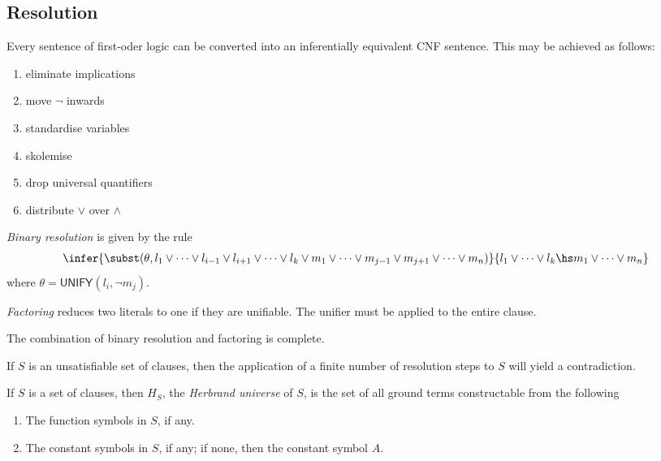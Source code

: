 \documentclass{article}
\begin{document}
\subsection{Resolution}

\begin{theorem}
    Every sentence of first-oder logic can be converted into an inferentially equivalent
    CNF sentence. This may be achieved as follows:
    \begin{enumerate}
        \item eliminate implications
        \item move $\neg$ inwards
        \item standardise variables
        \item skolemise
        \item drop universal quantifiers
        \item distribute $\vee$ over $\wedge$
    \end{enumerate}
\end{theorem}


\begin{definition}
    \emph{Binary resolution} is given by the rule
    \begin{align*}
        \infer{\subst(\theta,l_1\vee \cdots\vee l_{i-1}\vee l_{i+1}\vee\cdots\vee l_k\vee m_1\vee\cdots\vee m_{j-1}\vee m_{j+1}\vee \cdots\vee m_n)}{
            l_1\vee\cdots \vee l_k\hs m_1\vee\cdots\vee m_n
        } 
    \end{align*}
    where $\theta=\textsf{UNIFY}(l_i,\neg m_j)$.
\end{definition}

\begin{definition}
    \emph{Factoring} reduces two literals to one if they are unifiable. The unifier must be applied to the
    entire clause.
\end{definition}

\begin{theorem}
    The combination of binary resolution and factoring is complete.
\end{theorem}

\begin{theorem}
    If $S$ is an unsatisfiable set of clauses, then the application of a finite number of
    resolution steps to $S$ will yield a contradiction.
\end{theorem}

\begin{definition}
    If $S$ is a set of clauses, then $H_S$, the \emph{Herbrand universe} of $S$, is 
    the set of all ground terms constructable from the following
    \begin{enumerate}
        \item The function symbols in $S$, if any.
        \item The constant symbols in $S$, if any; if none, then the constant symbol $A$.
    \end{enumerate}
\end{definition}
\end{document}
